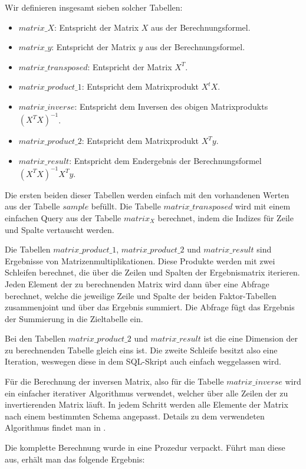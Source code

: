 Wir definieren insgesamt sieben solcher Tabellen:
\begin{itemize}
  \item $matrix\_X$: Entspricht der Matrix $X$ aus der Berechnungsformel.
  \item $matrix\_y$: Entspricht der Matrix $y$ aus der Berechnungsformel.
  \item $matrix\_transposed$: Entspricht der Matrix $X^T$.
  \item $matrix\_product\_1$: Entspricht dem Matrixprodukt $X^t X$.
  \item $matrix\_inverse$: Entspricht dem Inversen des obigen Matrixprodukts $(X^T X)^{-1}$.
  \item $matrix\_product\_2$: Entspricht dem Matrixprodukt $X^T y$.
  \item $matrix\_result$: Entspricht dem Endergebnis der Berechnungsformel $(X^T X)^{-1} X^T y$.
\end{itemize}

Die ersten beiden dieser Tabellen werden einfach mit den vorhandenen Werten aus der Tabelle $sample$ befüllt. Die Tabelle $matrix\_transposed$ wird mit einem einfachen Query aus der Tabelle $matrix_X$ berechnet, indem die Indizes für Zeile und Spalte vertauscht werden.

Die Tabellen $matrix\_product\_1$, $matrix\_product\_2$ und $matrix\_result$ sind Ergebnisse von Matrizenmultiplikationen. Diese Produkte werden mit zwei Schleifen berechnet, die über die Zeilen und Spalten der Ergebnismatrix iterieren. Jeden Element der zu berechnenden Matrix wird dann über eine Abfrage berechnet, welche die jeweilige Zeile und Spalte der beiden Faktor-Tabellen zusammenjoint und über das Ergebnis summiert. Die Abfrage fügt das Ergebnis der Summierung in die Zieltabelle ein.

Bei den Tabellen $matrix\_product\_2$ und $matrix\_result$ ist die eine Dimension der zu berechnenden Tabelle gleich eins ist. Die zweite Schleife besitzt also eine Iteration, weswegen diese in dem SQL-Skript auch einfach weggelassen wird.

Für die Berechnung der inversen Matrix, also für die Tabelle $matrix\_inverse$ wird ein einfacher iterativer Algorithmus verwendet, welcher über alle Zeilen der zu invertierenden Matrix läuft. In jedem Schritt werden alle Elemente der Matrix nach einem bestimmten Schema angepasst. Details zu dem verwendeten Algorithmus findet man in \cite{matrix}.

Die komplette Berechnung wurde in eine Prozedur verpackt. Führt man diese aus, erhält man das folgende Ergebnis:

